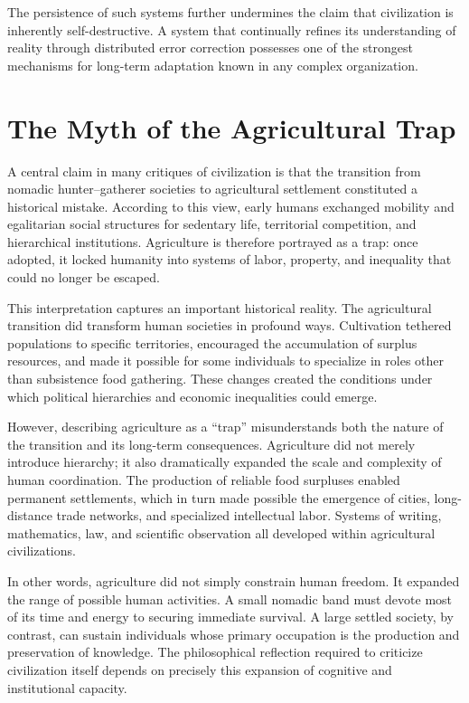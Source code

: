 \documentclass[12pt]{article}
\begin{document}
The persistence of such systems further undermines the claim that civilization is inherently self-destructive. A system that continually refines its understanding of reality through distributed error correction possesses one of the strongest mechanisms for long-term adaptation known in any complex organization.

\section{The Myth of the Agricultural Trap}

A central claim in many critiques of civilization is that the transition from nomadic hunter--gatherer societies to agricultural settlement constituted a historical mistake. According to this view, early humans exchanged mobility and egalitarian social structures for sedentary life, territorial competition, and hierarchical institutions. Agriculture is therefore portrayed as a trap: once adopted, it locked humanity into systems of labor, property, and inequality that could no longer be escaped.

This interpretation captures an important historical reality. The agricultural transition did transform human societies in profound ways. Cultivation tethered populations to specific territories, encouraged the accumulation of surplus resources, and made it possible for some individuals to specialize in roles other than subsistence food gathering. These changes created the conditions under which political hierarchies and economic inequalities could emerge.

However, describing agriculture as a ``trap'' misunderstands both the nature of the transition and its long-term consequences. Agriculture did not merely introduce hierarchy; it also dramatically expanded the scale and complexity of human coordination. The production of reliable food surpluses enabled permanent settlements, which in turn made possible the emergence of cities, long-distance trade networks, and specialized intellectual labor. Systems of writing, mathematics, law, and scientific observation all developed within agricultural civilizations.

In other words, agriculture did not simply constrain human freedom. It expanded the range of possible human activities. A small nomadic band must devote most of its time and energy to securing immediate survival. A large settled society, by contrast, can sustain individuals whose primary occupation is the production and preservation of knowledge. The philosophical reflection required to criticize civilization itself depends on precisely this expansion of cognitive and institutional capacity.
\end{document}

